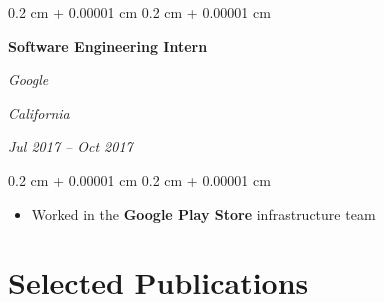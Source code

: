 \documentclass[10pt, letterpaper]{article}
\newenvironment{highlights}{
    \begin{itemize}[
        topsep=0.10 cm,
        parsep=0.10 cm,
        partopsep=0pt,
        itemsep=0pt,
        leftmargin=0.4 cm + 10pt
    ]
}{
    \end{itemize}
} %
\newenvironment{onecolentry}{
    \begin{adjustwidth}{
        0.2 cm + 0.00001 cm
    }{
        0.2 cm + 0.00001 cm
    }
}{
    \end{adjustwidth}
} %
\newenvironment{twocolentry}[2][]{
    \onecolentry
    \def\secondColumn{#2}
    \setcolumnwidth{\fill, 4.5 cm}
    \begin{paracol}{2}
}{
    \switchcolumn \raggedleft \secondColumn
    \end{paracol}
    \endonecolentry
} %
\begin{document}
    \begin{twocolentry}{
    \textit{California}
        
    \textit{Jul 2017 – Oct 2017}}
        \textbf{Software Engineering Intern}
        
        \textit{Google}
    \end{twocolentry}

    \vspace{0.10 cm}
    \begin{onecolentry}
        \begin{highlights}
            \item Worked in the \textbf{Google Play Store} infrastructure team
        \end{highlights}
    \end{onecolentry}

    \section{Selected Publications}
\end{document}
